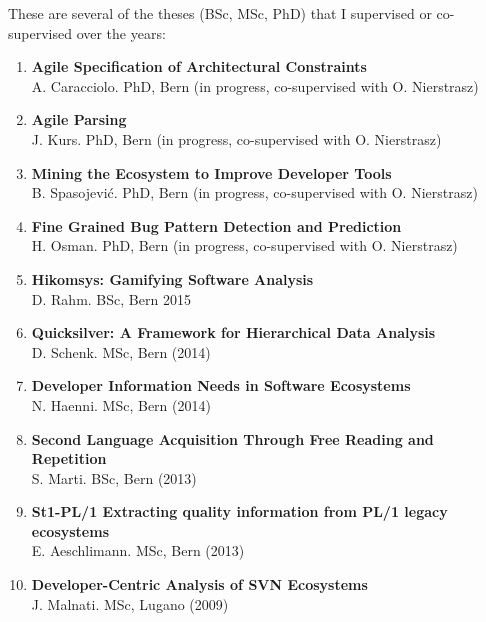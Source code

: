 
\newcommand{\super}[5]{\item {\bf #2}\\ #1. #3, #4 #5}
\newcommand{\inprogr}{{\footnotesize(in progress)}}
\newcommand{\inprogrcosup}{{\footnotesize(in progress, co-supervised with O. Nierstrasz)}}

\newcommand{\yr}[1]{(#1)}

These are several of the theses (BSc, MSc, PhD) that I supervised or co-supervised over the years:

\begin{enumerate}

\super 
	{A. Caracciolo}
	{Agile Specification of Architectural Constraints}
	{PhD}
	{Bern}
	{\inprogrcosup}

\super 
	{J. Kurs}
	{Agile Parsing}
	{PhD}
	{Bern}
	{\inprogrcosup}	

\super 
	{B. Spasojevi\'{c}}
	{Mining the Ecosystem to Improve Developer Tools}
	{PhD}
	{Bern}
	{\inprogrcosup}

\super 
	{H. Osman}
	{Fine Grained Bug Pattern Detection and Prediction}
	{PhD}
	{Bern}
	{\inprogrcosup}	



\super 
	{D. Rahm}
	{Hikomsys: Gamifying Software Analysis}
	{BSc}
	{Bern}
	{2015}


\super 
	{D. Schenk}
	{Quicksilver: A Framework for Hierarchical Data Analysis}
	{MSc}
	{Bern}
	{\yr{2014}}

\super 
	{N. Haenni}
	{Developer Information Needs in Software Ecosystems}
	{MSc}
	{Bern}
	{\yr{2014}}

\super 
	{S. Marti}
	{Second Language Acquisition Through Free Reading and Repetition}
	{BSc}
	{Bern}
	{\yr{2013}}

\super 
	{E. Aeschlimann}
	{St1-PL/1
Extracting quality information from PL/1 legacy ecosystems}
	{MSc}
	{Bern}
	{\yr{2013}}



\super 
	{J. Malnati}
	{Developer-Centric Analysis of SVN Ecosystems}
	{MSc}
	{Lugano}
	{\yr{2009}}



\end{enumerate}